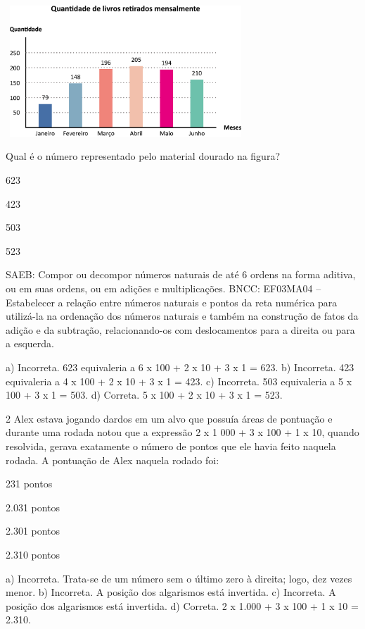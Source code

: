 {\begin{escolha}
{\includegraphics[width=3.55128in,height=1.93600in]{media/image106.png}

Qual é o número representado pelo material dourado na figura?

\begin{escolha}
\item
  623
\item
  423
\item
  503
\item
  523
\end{escolha}

SAEB: Compor ou decompor números naturais de até 6 ordens na forma aditiva, ou em suas ordens, ou em adições e multiplicações.
BNCC: EF03MA04 -- Estabelecer a relação entre números naturais e pontos da reta numérica para
utilizá-la na ordenação dos números naturais e também na construção de fatos da adição e da
subtração, relacionando-os com deslocamentos para a direita ou para a esquerda.

a) Incorreta. 623 equivaleria a 6 x 100 + 2 x 10 + 3 x 1 = 623.
b) Incorreta. 423 equivaleria a 4 x 100 + 2 x 10 + 3 x 1 = 423.
c) Incorreta. 503 equivaleria a 5 x 100 + 3 x 1 = 503.
d) Correta. 5 x 100 + 2 x 10 + 3 x 1 = 523.

\num{2} Alex estava jogando dardos em um alvo que possuía áreas de pontuação e
durante uma rodada notou que a expressão 2 x 1 000 + 3 x 100 + 1 x 10,
quando resolvida, gerava exatamente o número de pontos que ele havia
feito naquela rodada. A pontuação de Alex naquela rodado foi:

\begin{escolha}
\item
  231 pontos
\item
  2.031 pontos
\item
  2.301 pontos
\item
  2.310 pontos
\end{escolha}

a) Incorreta. Trata-se de um número sem o último zero à direita; logo, dez vezes menor.
b) Incorreta. A posição dos algarismos está invertida.
c) Incorreta. A posição dos algarismos está invertida.
d) Correta. 2 x 1.000 + 3 x 100 + 1 x 10 = 2.310.


}
\end{escolha}}

